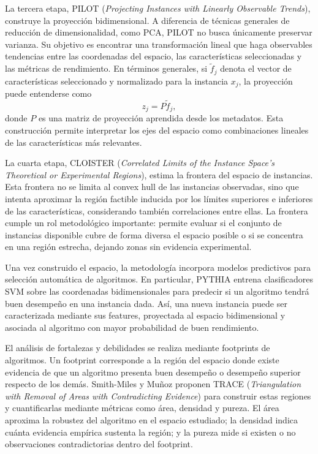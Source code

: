 La tercera etapa, PILOT (\textit{Projecting Instances with Linearly Observable Trends}), construye
la proyección bidimensional. A diferencia de técnicas generales de reducción de dimensionalidad,
como PCA, PILOT no busca únicamente preservar varianza. Su objetivo es encontrar una
transformación lineal que haga observables tendencias entre las coordenadas del espacio, las
características seleccionadas y las métricas de rendimiento. En términos generales, si
$\tilde f_j$ denota el vector de características seleccionado y normalizado para la instancia $x_j$,
la proyección puede entenderse como
\[
    z_j = P\tilde f_j,
\]
donde $P$ es una matriz de proyección aprendida desde los metadatos. Esta construcción permite
interpretar los ejes del espacio como combinaciones lineales de las características más relevantes.

La cuarta etapa, CLOISTER (\textit{Correlated Limits of the Instance Space's Theoretical or
Experimental Regions}), estima la frontera del espacio de instancias. Esta frontera no se limita al
convex hull de las instancias observadas, sino que intenta aproximar la región factible inducida por
los límites superiores e inferiores de las características, considerando también correlaciones entre
ellas. La frontera cumple un rol metodológico importante: permite evaluar si el conjunto de
instancias disponible cubre de forma diversa el espacio posible o si se concentra en una región
estrecha, dejando zonas sin evidencia experimental.

Una vez construido el espacio, la metodología incorpora modelos predictivos para selección
automática de algoritmos. En particular, PYTHIA entrena clasificadores SVM sobre las coordenadas
bidimensionales para predecir si un algoritmo tendrá buen desempeño en una instancia dada. Así,
una nueva instancia puede ser caracterizada mediante sus features, proyectada al espacio
bidimensional y asociada al algoritmo con mayor probabilidad de buen rendimiento.

El análisis de fortalezas y debilidades se realiza mediante footprints de algoritmos. Un footprint
corresponde a la región del espacio donde existe evidencia de que un algoritmo presenta buen
desempeño o desempeño superior respecto de los demás. Smith-Miles y Muñoz proponen TRACE
(\textit{Triangulation with Removal of Areas with Contradicting Evidence}) para construir estas
regiones y cuantificarlas mediante métricas como área, densidad y pureza. El área aproxima la
robustez del algoritmo en el espacio estudiado; la densidad indica cuánta evidencia empírica
sustenta la región; y la pureza mide si existen o no observaciones contradictorias dentro del
footprint.

